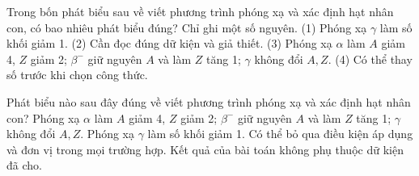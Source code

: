 \begin{ex}
Trong bốn phát biểu sau về viết phương trình phóng xạ và xác định hạt nhân con, có bao nhiêu phát biểu đúng? Chỉ ghi một số nguyên. (1) Phóng xạ $\gamma$ làm số khối giảm 1. (2) Cần đọc đúng dữ kiện và giả thiết. (3) Phóng xạ $\alpha$ làm $A$ giảm 4, $Z$ giảm 2; $\beta^-$ giữ nguyên $A$ và làm $Z$ tăng 1; $\gamma$ không đổi $A,Z$. (4) Có thể thay số trước khi chọn công thức.
\end{ex}

\begin{ex}
Phát biểu nào sau đây đúng về viết phương trình phóng xạ và xác định hạt nhân con?
\choice
{\True Phóng xạ $\alpha$ làm $A$ giảm 4, $Z$ giảm 2; $\beta^-$ giữ nguyên $A$ và làm $Z$ tăng 1; $\gamma$ không đổi $A,Z$.}
{Phóng xạ $\gamma$ làm số khối giảm 1.}
{Có thể bỏ qua điều kiện áp dụng và đơn vị trong mọi trường hợp.}
{Kết quả của bài toán không phụ thuộc dữ kiện đã cho.}
\end{ex}

